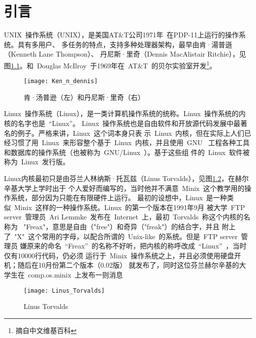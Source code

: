 \documentclass[../Main/thesis.tex]{subfiles}
\begin{document}
\chapter{引言}
\label{cha:intro}
UNIX~操作系统（UNIX），是美国AT\&T公司1971年~在PDP-11上运行的操作系统。具有多用户、
多任务的特点，支持多种处理器架构，最早由肯·湯普遜（Kenneth Lane Thompson）、
丹尼斯·里奇（Dennis MacAlistair Ritchie），见图\ref{fig:ken}。和~Douglas
McIlroy~于1969年在~AT\&T~的贝尔实验室开发\footnote{摘自中文维基百科}。\par
\begin{figure}[htbp]
  \centering
  \texttt{[image: Ken\_n\_dennis]}
  \caption{肯·汤普逊（左）和丹尼斯·里奇（右）}
  \label{fig:ken}
\end{figure}
Linux~操作系统（Linux），是一类计算机操作系统的统称。Linux~操作系统的内核的名字也是~“Linux”。
Linux~操作系统也是自由软件和开放源代码发展中最著名的例子。严格来讲，Linux~这个词本身只表
示~Linux~内核，但在实际上人们已经习惯了用~Linux~来形容整个基于~Linux~内核，并且使用~GNU~
工程各种工具和数据库的操作系统（也被称为~GNU/Linux~）。基于这些组
件的~Linux~软件被称为~Linux~发行版。

Linux内核最初只是由芬兰人林纳斯·托瓦兹（Linus
Torvalds），见图\ref{fig:linus}，在赫尔辛基大学上学时出于
个人爱好而编写的，当时他并不满意~Minix~这个教学用的操作系统，部分因为只能在有限硬件上运行。
最初的设想中，Linux~是一种类似~Minix~这样的一种操作系统。Linux~的第一个版本在1991年9月
被大学~FTP server~管理员~Ari Lemmke~发布在~Internet~上，最初~Torvalds~称这个内核的名称为
~"Freax"，意思是自由（"free"）和奇异（"freak"）的结合字，并且
附上了~"X"~这个常用的字母，以配合所谓的~Unix-like~的系统。但是~FTP server~管理员
嫌原来的命名~“Freax”~的名称不好听，把内核的称呼改成~“Linux”~，当时仅有10000行代码，仍必须
运行于~Minix~操作系统之上，并且必须使用硬盘开机；随后在10月份第二个版本（0.02版）
就发布了，同时这位芬兰赫尔辛基的大学生在~comp.os.minix~上发布一则消息\par
\begin{center}
\end{center}
\begin{figure}[htbp]
  \centering
  \texttt{[image: Linus\_Torvalds]}
  \caption{Linus Torvalds}
  \label{fig:linus}
\end{figure}
\end{document}
